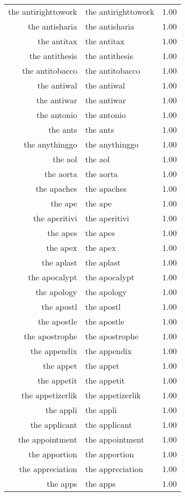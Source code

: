 \begin{table}[ht]
\begin{tabular}{rlr}
  the antirighttowork & the antirighttowork & 1.00 \\ 
  the antisharia & the antisharia & 1.00 \\ 
  the antitax & the antitax & 1.00 \\ 
  the antithesis & the antithesis & 1.00 \\ 
  the antitobacco & the antitobacco & 1.00 \\ 
  the antiwal & the antiwal & 1.00 \\ 
  the antiwar & the antiwar & 1.00 \\ 
  the antonio & the antonio & 1.00 \\ 
  the ants & the ants & 1.00 \\ 
  the anythinggo & the anythinggo & 1.00 \\ 
  the aol & the aol & 1.00 \\ 
  the aorta & the aorta & 1.00 \\ 
  the apaches & the apaches & 1.00 \\ 
  the ape & the ape & 1.00 \\ 
  the aperitivi & the aperitivi & 1.00 \\ 
  the apes & the apes & 1.00 \\ 
  the apex & the apex & 1.00 \\ 
  the aplast & the aplast & 1.00 \\ 
  the apocalypt & the apocalypt & 1.00 \\ 
  the apology & the apology & 1.00 \\ 
  the apostl & the apostl & 1.00 \\ 
  the apostle & the apostle & 1.00 \\ 
  the apostrophe & the apostrophe & 1.00 \\ 
  the appendix & the appendix & 1.00 \\ 
  the appet & the appet & 1.00 \\ 
  the appetit & the appetit & 1.00 \\ 
  the appetizerlik & the appetizerlik & 1.00 \\ 
  the appli & the appli & 1.00 \\ 
  the applicant & the applicant & 1.00 \\ 
  the appointment & the appointment & 1.00 \\ 
  the apportion & the apportion & 1.00 \\ 
  the appreciation & the appreciation & 1.00 \\ 
  the apps & the apps & 1.00 \\ 

\end{tabular}
\end{table}
